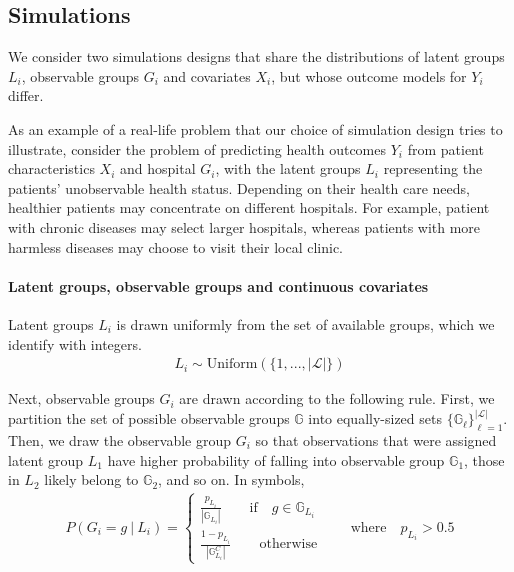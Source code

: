 \documentclass{article}
\theoremstyle{plain}
\theoremstyle{definition}
\theoremstyle{remark}
\begin{document}
\subsection{Simulations}
\label{sec:simulations}

We consider two simulations designs that share the distributions of latent groups $L_{i}$, observable groups $G_{i}$ and covariates $X_{i}$, but whose outcome models for $Y_{i}$ differ.

As an example of a real-life problem that our choice of simulation design tries to illustrate, consider the problem of predicting health outcomes $Y_{i}$ from patient characteristics $X_{i}$ and hospital $G_{i}$, with the latent groups $L_{i}$ representing the patients' unobservable health status. Depending on their health care needs, healthier patients may concentrate on different hospitals. For example, patient with chronic diseases may select larger hospitals, whereas patients with more harmless diseases may choose to visit their local clinic.

\paragraph{Latent groups, observable groups and continuous covariates} Latent groups $L_{i}$ is drawn uniformly from the set of available groups, which we identify with integers.
\begin{align}
    L_{i} \sim \text{Uniform}(\{1,...,|\mathcal{L}|\})
    \label{eq:latent_groups}
\end{align}

\noindent Next, observable groups $G_{i}$ are drawn according to the following rule. First, we partition the set of possible observable groups $\mathbb{G}$ into equally-sized sets $\{\mathbb{G}_{\ell}\}_{\ell=1}^{|\mathcal{L}|}$. Then, we draw the observable group $G_{i}$ so that observations that were assigned latent group $L_{1}$ have higher probability of falling into observable group $\mathbb{G}_{1}$, those in $L_{2}$ likely belong to $\mathbb{G}_{2}$, and so on. In symbols,
\begin{align}
    P(G_{i} = g \ | \ L_{i}) =
        \begin{cases}
            \frac{p_{L_{i}}}{|\mathbb{G}_{L_{i}}|}
            \qquad \text{if}\quad g \in \mathbb{G}_{L_{i}}\\
            \frac{1-p_{L_{i}}}{|\mathbb{G}_{L_{i}}^{C}|} \qquad \text{otherwise}
        \end{cases}
    \qquad
    \text{where} \quad p_{L_{i}} > 0.5
\end{align}
\end{document}
